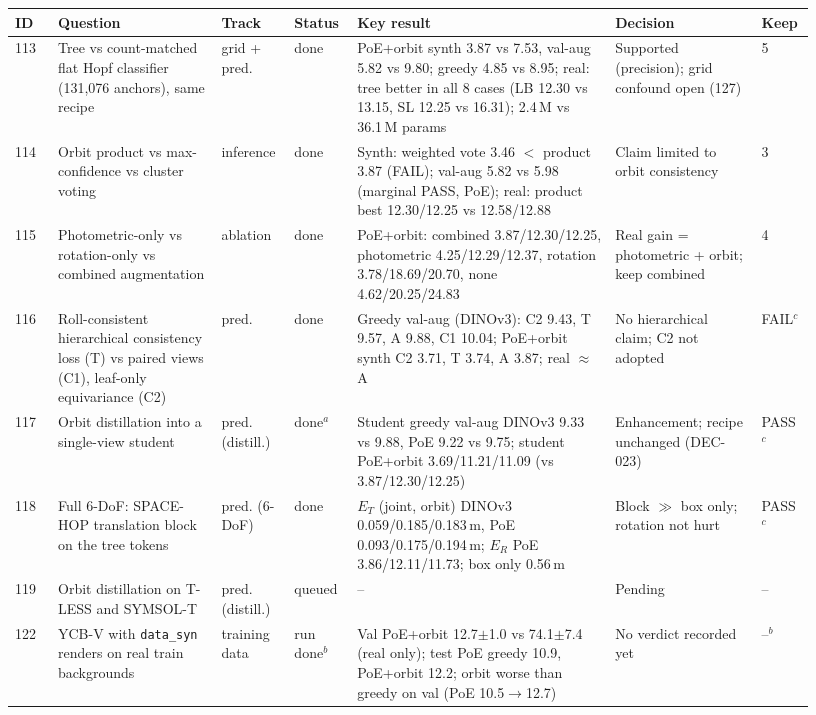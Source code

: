 \begin{table}[p]
  \centering\footnotesize
  \setlength{\tabcolsep}{2.5pt}
  \begin{tabular}{@{}p{0.05\linewidth}p{0.19\linewidth}p{0.085\linewidth}p{0.075\linewidth}p{0.305\linewidth}p{0.17\linewidth}p{0.05\linewidth}@{}}
    \toprule
    ID & Question & Track & Status & Key result & Decision & Keep \\
    \midrule
    113 & Tree vs count-matched flat Hopf classifier (131,076 anchors), same recipe & grid + pred. & done & PoE+orbit synth 3.87 vs 7.53, val-aug 5.82 vs 9.80; greedy 4.85 vs 8.95; real: tree better in all 8 cases (LB 12.30 vs 13.15, SL 12.25 vs 16.31); 2.4\,M vs 36.1\,M params & Supported (precision); grid confound open (127) & 5 \\
    114 & Orbit product vs max-confidence vs cluster voting & inference & done & Synth: weighted vote 3.46 $<$ product 3.87 (FAIL); val-aug 5.82 vs 5.98 (marginal PASS, PoE); real: product best 12.30/12.25 vs 12.58/12.88 & Claim limited to orbit consistency & 3 \\
    115 & Photometric-only vs rotation-only vs combined augmentation & ablation & done & PoE+orbit: combined 3.87/12.30/12.25, photometric 4.25/12.29/12.37, rotation 3.78/18.69/20.70, none 4.62/20.25/24.83 & Real gain = photometric + orbit; keep combined & 4 \\
    116 & Roll-consistent hierarchical consistency loss (T) vs paired views (C1), leaf-only equivariance (C2) & pred. & done & Greedy val-aug (DINOv3): C2 9.43, T 9.57, A 9.88, C1 10.04; PoE+orbit synth C2 3.71, T 3.74, A 3.87; real $\approx$ A & No hierarchical claim; C2 not adopted & FAIL$^{c}$ \\
    117 & Orbit distillation into a single-view student & pred. (distill.) & done$^{a}$ & Student greedy val-aug DINOv3 9.33 vs 9.88, PoE 9.22 vs 9.75; student PoE+orbit 3.69/11.21/11.09 (vs 3.87/12.30/12.25) & Enhancement; recipe unchanged (DEC-023) & PASS$^{c}$ \\
    118 & Full 6-DoF: SPACE-HOP translation block on the tree tokens & pred. (6-DoF) & done & $E_T$ (joint, orbit) DINOv3 0.059/0.185/0.183\,m, PoE 0.093/0.175/0.194\,m; $E_R$ PoE 3.86/12.11/11.73; box only 0.56\,m & Block $\gg$ box only; rotation not hurt & PASS$^{c}$ \\
    119 & Orbit distillation on T-LESS and SYMSOL-T & pred. (distill.) & queued & -- & Pending & -- \\
    122 & YCB-V with \texttt{data\_syn} renders on real train backgrounds & training data & run done$^{b}$ & Val PoE+orbit 12.7$\pm$1.0 vs 74.1$\pm$7.4 (real only); test PoE greedy 10.9, PoE+orbit 12.2; orbit worse than greedy on val (PoE 10.5$\to$12.7) & No verdict recorded yet & --$^{b}$ \\

\end{tabular}
\end{table}
